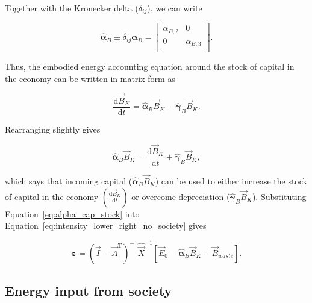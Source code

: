 \noindent{}Together with the Kronecker delta ($\delta_{ij}$), we can write

\begin{equation}
	\hat{\boldsymbol{\alpha}}_{B}
	\equiv
	\delta_{ij} \boldsymbol{\alpha}_{B}
	=
	\begin{bmatrix}
		\alpha_{B,2}	& 0           \\
		0               & \alpha_{B,3}  \\
	\end{bmatrix}.
\end{equation}

\noindent{}Thus, the embodied energy accounting equation around
the stock of capital in the economy can be written in matrix form as

\begin{equation}
	\frac{\mathrm{d}\vec{B}_{K}}{\mathrm{d}t}
	= \hat{\boldsymbol{\alpha}}_{B} \vec{B}_{K}
	- \hat{\boldsymbol{\gamma}}_{B} \vec{B}_{K}.
\end{equation}

\noindent{}Rearranging slightly gives

\begin{equation} \label{eq:alpha_cap_stock}
	\hat{\boldsymbol{\alpha}}_{B} \vec{B}_{K}
	= \frac{\mathrm{d}\vec{B}_{K}}{\mathrm{d}t}
	+ \hat{\boldsymbol{\gamma}}_{B} \vec{B}_{K},
\end{equation}

\noindent{}which says that incoming capital ($\hat{\boldsymbol{\alpha}}_{B} \vec{B}_{K}$)
can be used to either
increase the stock of capital in the economy 
$\left( \frac{\mathrm{d}\vec{B}_{K}}{\mathrm{d}t} \right)$
or overcome depreciation ($\hat{\boldsymbol{\gamma}}_{B} \vec{B}_{K}$).
Substituting Equation~\ref{eq:alpha_cap_stock} into
Equation~\ref{eq:intensity_lower_right_no_society} gives

\begin{equation} \label{eq:epsilon_leontief_with_A_alpha}
	\boldsymbol{\varepsilon} 
	= {(\vec{I} - \vec{A}^{\mathrm{T}})}^{-1}\hat{\vec{X}}^{-1}
		\left[\vec{E}_{0} 
				- \hat{\boldsymbol{\alpha}}_{B} \vec{B}_{K}
				- \vec{B}_{waste}
		\right].
\end{equation}


\subsection{Energy input from society}
\label{sec:energy_from_society}

